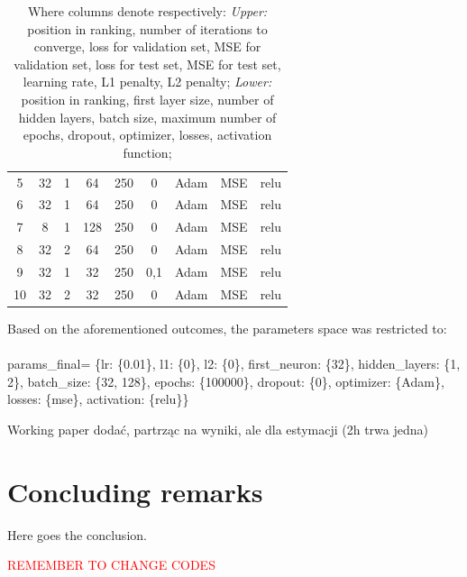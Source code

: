 \documentclass{Trade_template}
\numberwithin{equation}{section}
\begin{document}
\begin{table}[H]
{\begin{tabular}{*{9}{c}}
5  & 32            & 1              & 64          & 250    & 0       & Adam      & MSE    & relu       \\
6  & 32            & 1              & 64          & 250    & 0       & Adam      & MSE    & relu       \\
7  & 8             & 1              & 128         & 250    & 0       & Adam      & MSE    & relu       \\
8  & 32            & 2              & 64          & 250    & 0       & Adam      & MSE    & relu       \\
9  & 32            & 1              & 32          & 250    & 0,1     & Adam      & MSE    & relu       \\
10 & 32            & 2              & 32          & 250    & 0       & Adam      & MSE    & relu      \\ \bottomrule
\end{tabular}
\caption*{\tiny{Where columns denote respectively: \textit{Upper:} position in ranking, number of iterations to converge, loss for validation set, MSE for validation set, loss for test set, MSE for test set, learning rate, L1 penalty, L2 penalty; \textit{Lower:} position in ranking, first layer size, number of hidden layers, batch size, maximum number of epochs, dropout, optimizer, losses, activation function;}}}
\end{table}

Based on the aforementioned outcomes, the parameters space was restricted to: \\ \\
params\_final= \{lr: \{0.01\},
        l1: \{0\},
        l2: \{0\},
        first\_neuron: \{32\},
        hidden\_layers: \{1, 2\},
        batch\_size: \{32, 128\},
        epochs: \{100000\},
        dropout: \{0\},
        optimizer: \{Adam\},
        losses: \{mse\},
        activation: \{relu\}\}\
 

Working paper dodać, partrząc na wyniki, ale dla estymacji (2h trwa jedna)

\chapter{Concluding remarks} \label{Concluding remarks}

Here goes the conclusion.

\textcolor{red}{REMEMBER TO CHANGE CODES}

\newpage

\nocite{*}

\end{document}
